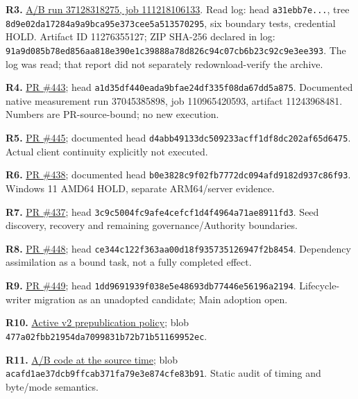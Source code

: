 \begin{cols}
\textbf{R3.} \href{https://github.com/ingolf-lohmann/qik-vrt/actions/runs/37128318275/job/111218106133}{A/B run 37128318275, job 111218106133}. Read log: head \texttt{a31ebb7e...}, tree \nolinkurl{8d9e02da17284a9a9bca95e373cee5a513570295}, six boundary tests, credential HOLD. Artifact ID 11276355127; ZIP SHA-256 declared in log: \nolinkurl{91a9d085b78ed856aa818e390e1c39888a78d826c94c07cb6b23c92c9e3ee393}. The log was read; that report did not separately redownload-verify the archive.

\textbf{R4.} \href{https://github.com/ingolf-lohmann/qik-vrt/pull/443}{PR \#443}; head \nolinkurl{a1d35df440eada9bfae24df335f08da67dd5a875}. Documented native measurement run 37045385898, job 110965420593, artifact 11243968481. Numbers are PR-source-bound; no new execution.

\textbf{R5.} \href{https://github.com/ingolf-lohmann/qik-vrt/pull/445}{PR \#445}; documented head \nolinkurl{d4abb49133dc509233acff1df8dc202af65d6475}. Actual client continuity explicitly not executed.

\textbf{R6.} \href{https://github.com/ingolf-lohmann/qik-vrt/pull/438}{PR \#438}; documented head \nolinkurl{b0e3828c9f02fb7772dc094afd9182d937c86f93}. Windows 11 AMD64 HOLD, separate ARM64/server evidence.

\textbf{R7.} \href{https://github.com/ingolf-lohmann/qik-vrt/pull/437}{PR \#437}; head \nolinkurl{3c9c5004fc9afe4cefcf1d4f4964a71ae8911fd3}. Seed discovery, recovery and remaining governance/Authority boundaries.

\textbf{R8.} \href{https://github.com/ingolf-lohmann/qik-vrt/pull/448}{PR \#448}; head \nolinkurl{ce344c122f363aa00d18f935735126947f2b8454}. Dependency assimilation as a bound task, not a fully completed effect.

\textbf{R9.} \href{https://github.com/ingolf-lohmann/qik-vrt/pull/449}{PR \#449}; head \nolinkurl{1dd9691939f038e5e48693db77446e56196a2194}. Lifecycle-writer migration as an unadopted candidate; Main adoption open.

\textbf{R10.} \href{https://github.com/ingolf-lohmann/qik-vrt/blob/8153c4e69a6245aadf67f0741fb50d9707c19e34/policy/ZENODO_MACHINE_PROOF_BEFORE_PUBLICATION.md}{Active v2 prepublication policy}; blob \nolinkurl{477a02fbb21954da7099831b72b71b51169952ec}.

\textbf{R11.} \href{https://github.com/ingolf-lohmann/qik-vrt/blob/a31ebb7eb810334c4f00ebadd4604fa5cf45abea/tools/qikvrt_live_authority_mirror_ab.py}{A/B code at the source time}; blob \nolinkurl{acafd1ae37dcb9ffcab371fa79e3e874cfe83b91}. Static audit of timing and byte/mode semantics.


\end{cols}
